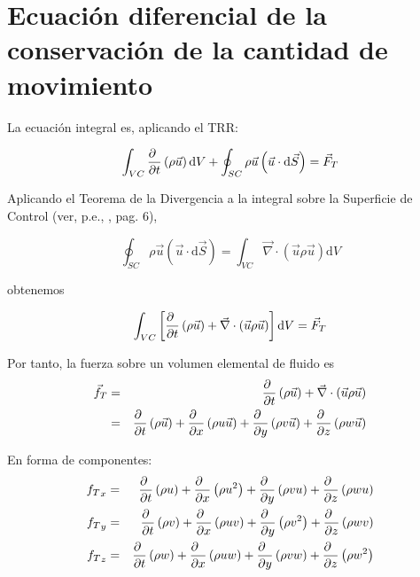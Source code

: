 \section{Ecuación diferencial de la conservación de la cantidad de movimiento}

	
	La ecuación integral es, aplicando el TRR: 
	
	\begin{equation}
		\int_{VC}\frac{\partial \phantom{t}}{\partial t}\left(\rho\vec{u}\right)\text{d}V+\oint_{SC}\rho\vec{u}\left(\vec{u}\cdot\text{d}\vec{S}\right)=\vec{F}_{T}
	\end{equation}
	
	
	Aplicando el Teorema de la Divergencia a la integral sobre la Superficie
	de Control (ver, p.e., \cite{Liggett1994}, pag. 6), 
	
	\begin{equation}
		\oint_{SC}\rho\vec{u}\left(\vec{u}\cdot\text{d}\vec{S}\right)=\int_{VC}\vec{\nabla}\cdot\left(\vec{u}\rho\vec{u}\right)\text{d}V
	\end{equation}
	
	obtenemos 
	
	\begin{equation}
		\int_{VC}\left[\frac{\partial \phantom{t}}{\partial t}\left(\rho\vec{u}\right)+\vec{\nabla}\cdot\left(\vec{u}\rho\vec{u}\right)\right]\text{d}V=\vec{F}_{T}
	\end{equation}
	
	
	
	Por tanto, la fuerza sobre un volumen elemental de fluido es 
	\begin{eqnarray}
		\vec{f}_{T} & = & \frac{\partial \phantom{t}}{\partial t}\left(\rho\vec{u}\right)+\vec{\nabla}\cdot\left(\vec{u}\rho\vec{u}\right)\\
		& = & \frac{\partial \phantom{t}}{\partial t}\left(\rho\vec{u}\right)+\frac{\partial \phantom{x}}{\partial x}\left(\rho u\vec{u}\right)+\frac{\partial \phantom{y}}{\partial y}\left(\rho v\vec{u}\right)+\frac{\partial \phantom{z}}{\partial z}\left(\rho w\vec{u}\right)
	\end{eqnarray}
	
	En forma de componentes: 
	\begin{eqnarray}
		{f_{T}}_{x} & = & \frac{\partial \phantom{t}}{\partial t}\left(\rho u\right)+\frac{\partial \phantom{x}}{\partial x}\left(\rho u^{2}\right)+\frac{\partial \phantom{y}}{\partial y}\left(\rho vu\right)+\frac{\partial \phantom{z}}{\partial z}\left(\rho wu\right)\\
		{f_{T}}_{y} & = & \frac{\partial \phantom{t}}{\partial t}\left(\rho v\right)+\frac{\partial \phantom{x}}{\partial x}\left(\rho uv\right)+\frac{\partial \phantom{y}}{\partial y}\left(\rho v^{2}\right)+\frac{\partial \phantom{z}}{\partial z}\left(\rho wv\right)\\
		{f_{T}}_{z} & = & \frac{\partial \phantom{t}}{\partial t}\left(\rho w\right)+\frac{\partial \phantom{x}}{\partial x}\left(\rho uw\right)+\frac{\partial \phantom{y}}{\partial y}\left(\rho vw\right)+\frac{\partial \phantom{z}}{\partial z}\left(\rho w^{2}\right)
	\end{eqnarray}
	

